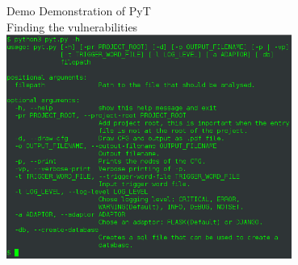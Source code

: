 \begin{frame}{Demo}
  \centering
  Demonstration of PyT \\
  Finding the vulnerabilities
    \includegraphics[width=0.7\textwidth]{graphics/pyt_overview.png}
\end{frame}


